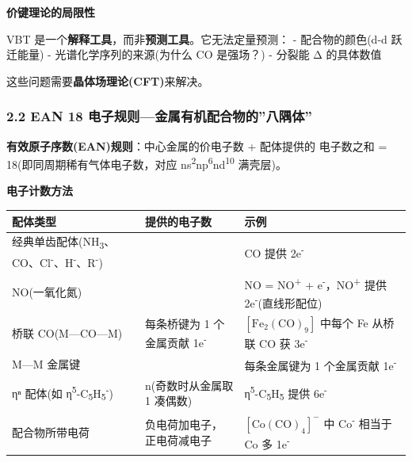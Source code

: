 \textbf{价键理论的局限性}

VBT 是一个\textbf{解释工具}，而非\textbf{预测工具}。它无法定量预测：
- 配合物的颜色(d-d 跃迁能量)
- 光谱化学序列的来源(为什么 CO 是强场？)
- 分裂能 Δ 的具体数值

这些问题需要\textbf{晶体场理论(CFT)}来解决。

\subsubsection{2.2 EAN 18 电子规则---金属有机配合物的''八隅体''}\label{ean-18-ux7535ux5b50ux89c4ux5219ux91d1ux5c5eux6709ux673aux914dux5408ux7269ux7684ux516bux9685ux4f53}

\textbf{有效原子序数(EAN)规则}：中心金属的价电子数 + 配体提供的  电子数之和 = 18(即同周期稀有气体电子数，对应 ns\textsuperscript{2}np\textsuperscript{6}nd\textsuperscript{10} 满壳层)。

\textbf{电子计数方法}

{\def\LTcaptype{none} %
\begin{longtable}[]{@{}
  >{\raggedright\arraybackslash}p{}
  >{\centering\arraybackslash}p{}
  >{\raggedright\arraybackslash}p{}@{}}
\toprule\noalign{}
\begin{minipage}[b]{\linewidth}\raggedright
配体类型
\end{minipage} & \begin{minipage}[b]{\linewidth}\centering
提供的电子数
\end{minipage} & \begin{minipage}[b]{\linewidth}\raggedright
示例
\end{minipage} \\
\midrule\noalign{}
\endhead
\bottomrule\noalign{}
\endlastfoot
经典单齿配体(NH\textsubscript{3}、CO、Cl\textsuperscript{-}、H\textsuperscript{-}、R\textsuperscript{-}) & 2 & CO 提供 2e\textsuperscript{-} \\
NO(一氧化氮) & 3 & NO = NO\textsuperscript{+} + e\textsuperscript{-}，NO\textsuperscript{+} 提供 2e\textsuperscript{-}(直线形配位) \\
桥联 CO(M---CO---M) & 每条桥键为 1 个金属贡献 1e\textsuperscript{-} & \([\mathrm{Fe_2(CO)_9}]\) 中每个 Fe 从桥联 CO 获 3e\textsuperscript{-} \\
M---M 金属键 & 1 & 每条金属键为 1 个金属贡献 1e\textsuperscript{-} \\
ηⁿ 配体(如 η\textsuperscript{5}-C\textsubscript{5}H\textsubscript{5}\textsuperscript{-}) & n(奇数时从金属取 1 凑偶数) & η\textsuperscript{5}-C\textsubscript{5}H\textsubscript{5} 提供 6e\textsuperscript{-} \\
配合物所带电荷 & 负电荷加电子，正电荷减电子 & \([\mathrm{Co(CO)_4}]^-\) 中 Co\textsuperscript{-} 相当于 Co 多 1e\textsuperscript{-} \\
\end{longtable}
}

